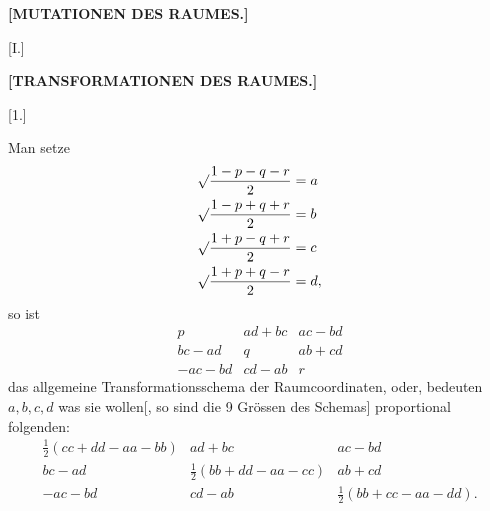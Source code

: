 \begin{center}\bfseries [MUTATIONEN DES RAUMES.]\end{center}
\begin{center}[I.]\end{center}
\begin{center}\bfseries [TRANSFORMATIONEN DES RAUMES.]\end{center}
\begin{center}[1.]\end{center}

Man setze
\[
\begin{aligned}
\mathord{\surd}\frac{1-p-q-r}{2}&=a\\
\mathord{\surd}\frac{1-p+q+r}{2}&=b\\
\mathord{\surd}\frac{1+p-q+r}{2}&=c\\
\mathord{\surd}\frac{1+p+q-r}{2}&=d,
\end{aligned}
\]
so ist
\[
\begin{array}{ccc}
p&ad+bc&ac-bd\\
bc-ad&q&ab+cd\\
-ac-bd&cd-ab&r
\end{array}
\]
das allgemeine Transformationsschema der Raumcoordinaten, oder, bedeuten $a,b,c,d$ was sie wollen[, so sind die 9 Grössen des Schemas] proportional folgenden:
\[
\begin{array}{ccc}
\tfrac12(cc+dd-aa-bb)&ad+bc&ac-bd\\
bc-ad&\tfrac12(bb+dd-aa-cc)&ab+cd\\
-ac-bd&cd-ab&\tfrac12(bb+cc-aa-dd).
\end{array}
\]
